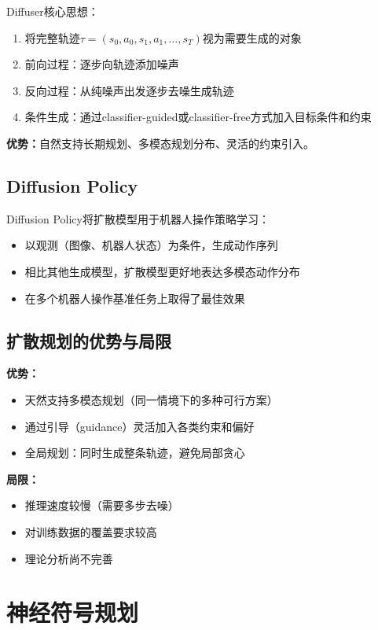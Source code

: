\begin{keypoint}
Diffuser核心思想：
\begin{enumerate}
  \item 将完整轨迹$\tau = (s_0, a_0, s_1, a_1, \ldots, s_T)$视为需要生成的对象
  \item 前向过程：逐步向轨迹添加噪声
  \item 反向过程：从纯噪声出发逐步去噪生成轨迹
  \item 条件生成：通过classifier-guided或classifier-free方式加入目标条件和约束
\end{enumerate}
\textbf{优势：}自然支持长期规划、多模态规划分布、灵活的约束引入。
\end{keypoint}

\subsection{Diffusion Policy}

Diffusion Policy将扩散模型用于机器人操作策略学习：
\begin{itemize}
  \item 以观测（图像、机器人状态）为条件，生成动作序列
  \item 相比其他生成模型，扩散模型更好地表达多模态动作分布
  \item 在多个机器人操作基准任务上取得了最佳效果
\end{itemize}

\subsection{扩散规划的优势与局限}

\textbf{优势：}
\begin{itemize}
  \item 天然支持多模态规划（同一情境下的多种可行方案）
  \item 通过引导（guidance）灵活加入各类约束和偏好
  \item 全局规划：同时生成整条轨迹，避免局部贪心
\end{itemize}

\textbf{局限：}
\begin{itemize}
  \item 推理速度较慢（需要多步去噪）
  \item 对训练数据的覆盖要求较高
  \item 理论分析尚不完善
\end{itemize}

\section{神经符号规划 \self}

